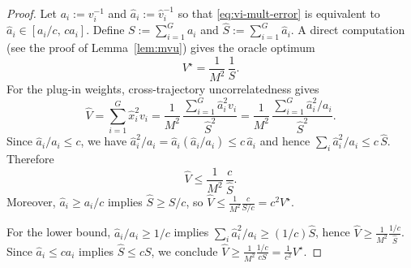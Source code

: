 \begin{proof}
Let $a_i:=v_i^{-1}$ and $\widehat{a}_i:=\widehat{v}_i^{-1}$ so that \eqref{eq:vi-mult-error} is equivalent to
$\widehat{a}_i\in[a_i/c,\,c a_i]$.
Define $S:=\sum_{i=1}^G a_i$ and $\widehat{S}:=\sum_{i=1}^G \widehat{a}_i$.
A direct computation (see the proof of Lemma~\ref{lem:mvu}) gives the oracle optimum
\[
V^\star=\frac{1}{M^2}\,\frac{1}{S}.
\]
For the plug-in weights, cross-trajectory uncorrelatedness gives
\[
\widehat{V}
=\sum_{i=1}^G \widehat{x}_i^2 v_i
=\frac{1}{M^2}\,\frac{\sum_{i=1}^G \widehat{a}_i^2 v_i}{\widehat{S}^2}
=\frac{1}{M^2}\,\frac{\sum_{i=1}^G \widehat{a}_i^2/a_i}{\widehat{S}^2}.
\]
Since $\widehat{a}_i/a_i\le c$, we have $\widehat{a}_i^2/a_i=\widehat{a}_i(\widehat{a}_i/a_i)\le c\,\widehat{a}_i$ and hence
$\sum_i \widehat{a}_i^2/a_i \le c\,\widehat{S}$.
Therefore
\[
\widehat{V}\le \frac{1}{M^2}\,\frac{c}{\widehat{S}}.
\]
Moreover, $\widehat{a}_i\ge a_i/c$ implies $\widehat{S}\ge S/c$, so $\widehat{V}\le \frac{1}{M^2}\frac{c}{S/c}=c^2 V^\star$.

For the lower bound, $\widehat{a}_i/a_i\ge 1/c$ implies $\sum_i \widehat{a}_i^2/a_i \ge (1/c)\widehat{S}$, hence
$\widehat{V}\ge \frac{1}{M^2}\frac{1/c}{\widehat{S}}$.
Since $\widehat{a}_i\le c a_i$ implies $\widehat{S}\le c S$, we conclude
$\widehat{V}\ge \frac{1}{M^2}\frac{1/c}{c S}=\frac{1}{c^2}V^\star$.
\end{proof}



